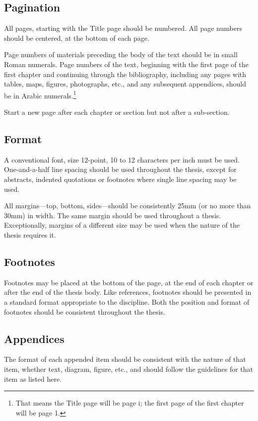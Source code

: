 \subsection{Pagination}

All pages, starting with the Title page should be numbered. All page numbers should be centered, at the bottom of each page.

Page numbers of materials preceding the body of the text should be in small Roman numerals. Page numbers of the text, beginning with the first page of the first chapter and continuing through the bibliography, including any pages with tables, maps, figures, photographs, etc., and any subsequent appendices, should be in Arabic numerals.\footnote{That means the Title page will be page i; the first page of the first chapter will be page 1.}

Start a new page after each chapter or section but not after a sub-section.

\subsection{Format}

A conventional font, size 12-point, 10 to 12 characters per inch must be used. One-and-a-half line spacing should be used throughout the thesis, except for abstracts, indented quotations or footnotes where single line spacing may be used.

All margins---top, bottom, sides---should be consistently 25mm (or no more than 30mm) in width. The same margin should be used throughout a thesis. Exceptionally, margins of a different size may be used when the nature of the thesis requires it.

\subsection{Footnotes}

Footnotes may be placed at the bottom of the page, at the end of each chapter or after the end of the thesis body. Like references, footnotes should be presented in a standard format appropriate to the discipline. Both the position and format of footnotes should be consistent throughout the thesis.

\subsection{Appendices}

The format of each appended item should be consistent with the nature of that item, whether text, diagram, figure, etc., and should follow the guidelines for that item as listed here.


